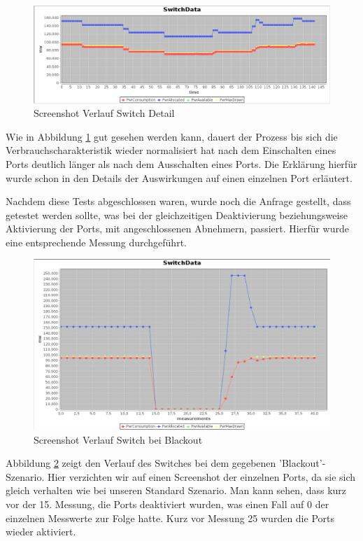 \begin{figure}[h]
    \centering
    \leavevmode
    \includegraphics[width=1.0\linewidth]{figures/switchConsequences}
    \caption{Screenshot Verlauf Switch Detail}
    \label{fig:switchDetails}
\end{figure}

Wie in Abbildung \ref{fig:switchDetails} gut gesehen werden kann, dauert der Prozess bis sich die Verbrauchscharakteristik wieder normalisiert hat nach dem Einschalten eines Ports deutlich länger als nach dem Ausschalten eines Ports. Die Erklärung hierfür wurde schon in den Details der Auswirkungen auf einen einzelnen Port erläutert.

Nachdem diese Tests abgeschlossen waren, wurde noch die Anfrage gestellt, dass getestet werden sollte, was bei der gleichzeitigen Deaktivierung beziehungsweise Aktivierung der Ports, mit angeschlossenen Abnehmern, passiert. Hierfür wurde eine entsprechende Messung durchgeführt.

\begin{figure}[h]
    \centering
    \leavevmode
    \includegraphics[width=1.0\linewidth]{figures/blackout}
    \caption{Screenshot Verlauf Switch bei Blackout}
    \label{fig:blackout}
\end{figure}

Abbildung \ref{fig:blackout} zeigt den Verlauf des Switches bei dem gegebenen 'Blackout'-Szenario. Hier verzichten wir auf einen Screenshot der einzelnen Ports, da sie sich gleich verhalten wie bei unseren Standard Szenario. Man kann sehen, dass kurz vor der 15. Messung, die Ports deaktiviert wurden, was einen Fall auf 0 der einzelnen Messwerte zur Folge hatte. Kurz vor Messung 25 wurden die Ports wieder aktiviert.

